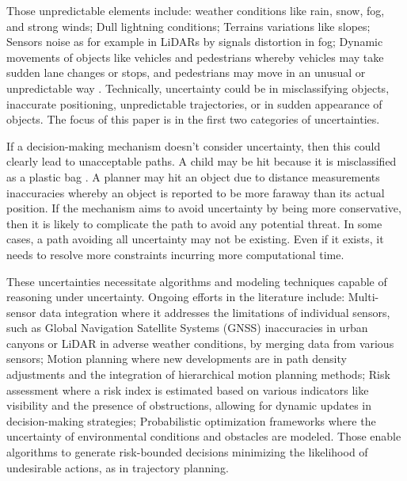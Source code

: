 \documentclass[pdflatex,sn-mathphys-num]{sn-jnl}%
\begin{document}
Those unpredictable elements include: weather conditions like rain, snow, fog, and strong winds; Dull lightning conditions; Terrains variations like slopes; Sensors noise as for example in LiDARs by signals distortion in fog; Dynamic movements of objects like vehicles and pedestrians whereby vehicles may take sudden lane changes or stops, and pedestrians may move in an unusual or unpredictable way \cite{alharbi2020global}. Technically, uncertainty could be in misclassifying objects, inaccurate positioning, unpredictable trajectories, or in sudden appearance of objects. The focus of this paper is in the first two categories of uncertainties.

If a decision-making mechanism doesn't consider uncertainty, then this could clearly lead to unacceptable paths. A child may be hit because it is misclassified as a plastic bag \cite{tahir2024object}. A planner may hit an object due to distance measurements inaccuracies \cite{itkina2022uncertainty} whereby an object is reported to be more faraway than its actual position. If the mechanism aims to avoid uncertainty by being more conservative, then it is likely to complicate the path to avoid any potential threat. In some cases, a path avoiding all uncertainty may not be existing. Even if it exists, it needs to resolve more constraints incurring more computational time.

These uncertainties necessitate algorithms and modeling techniques capable of reasoning under uncertainty. Ongoing efforts in the literature include: Multi-sensor data integration \cite{vargas2021overview} where it addresses the limitations of individual sensors, such as Global Navigation Satellite Systems (GNSS) inaccuracies in urban canyons or LiDAR in adverse weather conditions, by merging data from various sensors; Motion planning \cite{tang2022driving} where new developments are in path density adjustments and the integration of hierarchical motion planning methods; Risk assessment \cite{wang2021risk} where a risk index is estimated based on various indicators like visibility and the presence of obstructions, allowing for dynamic updates in decision-making strategies; Probabilistic optimization frameworks \cite{han2022non} where the uncertainty of environmental conditions and obstacles are modeled. Those enable algorithms to generate risk-bounded decisions minimizing the likelihood of undesirable actions, as in trajectory planning.
\end{document}
